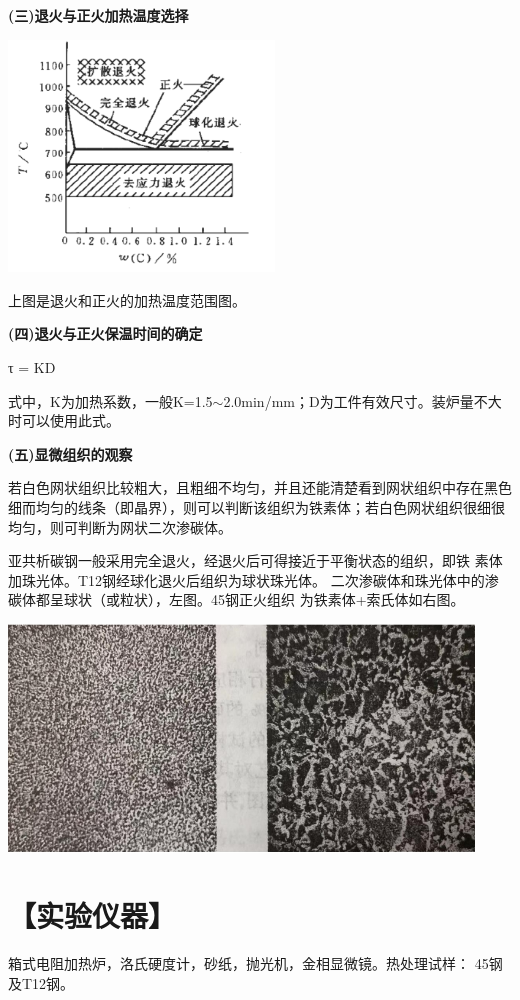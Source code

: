 \documentclass[a4paper,utf8]{article}
\begin{document}
\textbf{(三)退火与正火加热温度选择}

\begin{center}
    \includegraphics[width=200pt]{1.png}
\end{center}

上图是退火和正火的加热温度范围图。

\textbf{(四)退火与正火保温时间的确定 }

 τ = KD

式中，K为加热系数，一般K=1.5$\sim$2.0min/mm；D为工件有效尺寸。装炉量不大时可以使用此式。


\textbf{(五)显微组织的观察}

若白色网状组织比较粗大，且粗细不均匀，并且还能清楚看到网状组织中存在黑色细而均匀的线条（即晶界），则可以判断该组织为铁素体；若白色网状组织很细很均匀，则可判断为网状二次渗碳体。

亚共析碳钢一般采用完全退火，经退火后可得接近于平衡状态的组织，即铁
素体加珠光体。T12钢经球化退火后组织为球状珠光体。
二次渗碳体和珠光体中的渗碳体都呈球状（或粒状），左图。45钢正火组织
为铁素体+索氏体如右图。
\begin{center}
    \includegraphics[width=350pt]{2.png}
\end{center}
\section*{【实验仪器】}%
箱式电阻加热炉，洛氏硬度计，砂纸，抛光机，金相显微镜。热处理试样：
45钢及T12钢。
\end{document}
